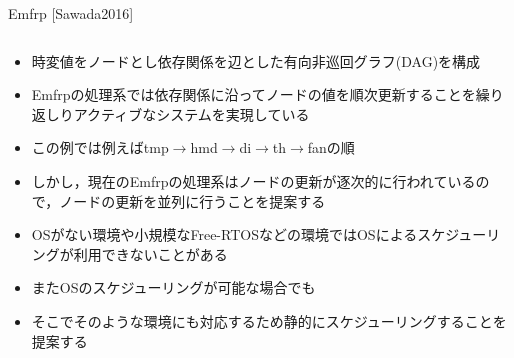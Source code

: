\documentclass[dvipdfmx,final,t,12pt]{beamer}
\begin{document}
\begin{frame}[fragile]
    \begin{block}{Emfrp \small{[Sawada2016]}}
        \begin{columns}
            \begin{column}{0.45\textwidth}
                \begin{itemize}
                    \item 時変値をノードとし依存関係を辺とした有向非巡回グラフ(DAG)を構成
                    \item Emfrpの処理系では依存関係に沿ってノードの値を順次更新することを繰り返しりアクティブなシステムを実現している
                    \item この例では例えばtmp$\rightarrow$hmd$\rightarrow$di$\rightarrow$th$\rightarrow$fanの順
                    \item しかし，現在のEmfrpの処理系はノードの更新が逐次的に行われているので，ノードの更新を並列に行うことを提案する
                    \item OSがない環境や小規模なFree-RTOSなどの環境ではOSによるスケジューリングが利用できないことがある
                    \item またOSのスケジューリングが可能な場合でも
                    \item そこでそのような環境にも対応するため静的にスケジューリングすることを提案する
                \end{itemize}
            \end{column}
        \end{columns}
    \end{block}


\end{frame}
\end{document}
